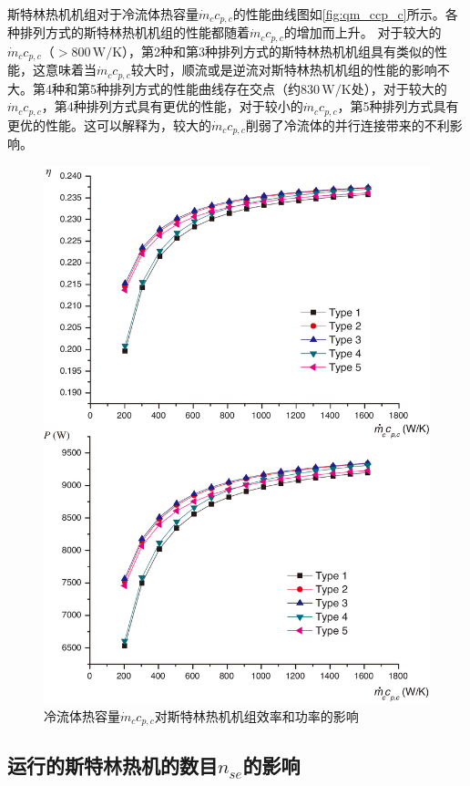 斯特林热机机组对于冷流体热容量$\dot{m}_cc_{p,c}$的性能曲线图如\autoref{fig:qm_ccp_c}所示。各种排列方式的斯特林热机机组的性能都随着$\dot{m}_cc_{p,c}$的增加而上升。
对于较大的$\dot{m}_cc_{p,c}$（$> 800\,\mathrm{W/K}$），第2种和第3种排列方式的斯特林热机机组具有类似的性能，这意味着当$\dot{m}_cc_{p,c}$较大时，顺流或是逆流对斯特林热机机组的性能的影响不大。第4种和第5种排列方式的性能曲线存在交点（约$830\,\mathrm{W/K}$处），对于较大的$\dot{m}_cc_{p,c}$，第4种排列方式具有更优的性能，对于较小的$\dot{m}_cc_{p,c}$，第5种排列方式具有更优的性能。这可以解释为，较大的$\dot{m}_cc_{p,c}$削弱了冷流体的并行连接带来的不利影响。
\begin{figure}[htbp]
\centering
	\includegraphics[width = 0.95\columnwidth]{fig/qm_ccp_c}
	\caption{冷流体热容量$\dot{m}_cc_{p,c}$对斯特林热机机组效率和功率的影响}
	\label{fig:qm_ccp_c}
\end{figure}

\subsection{运行的斯特林热机的数目$n_{se}$的影响}

